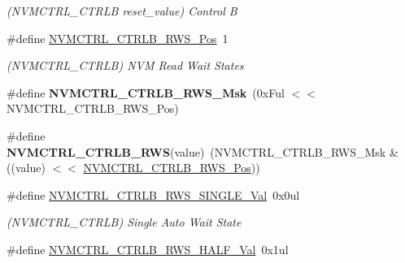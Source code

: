 \begin{DoxyCompactItemize}
\begin{DoxyCompactList}\small\item\em (N\+V\+M\+C\+T\+R\+L\+\_\+\+C\+T\+R\+L\+B reset\+\_\+value) Control B \end{DoxyCompactList}\item 
\hypertarget{group___s_a_m_l21___n_v_m_c_t_r_l_ga43e4b7eb29abd297bee59f003d715e26}{}\#define \hyperlink{group___s_a_m_l21___n_v_m_c_t_r_l_ga43e4b7eb29abd297bee59f003d715e26}{N\+V\+M\+C\+T\+R\+L\+\_\+\+C\+T\+R\+L\+B\+\_\+\+R\+W\+S\+\_\+\+Pos}~1\label{group___s_a_m_l21___n_v_m_c_t_r_l_ga43e4b7eb29abd297bee59f003d715e26}

\begin{DoxyCompactList}\small\item\em (N\+V\+M\+C\+T\+R\+L\+\_\+\+C\+T\+R\+L\+B) N\+V\+M Read Wait States \end{DoxyCompactList}\item 
\hypertarget{group___s_a_m_l21___n_v_m_c_t_r_l_gab5ad30e9547cbcc159748e0f014567f0}{}\#define {\bfseries N\+V\+M\+C\+T\+R\+L\+\_\+\+C\+T\+R\+L\+B\+\_\+\+R\+W\+S\+\_\+\+Msk}~(0x\+Ful $<$$<$ N\+V\+M\+C\+T\+R\+L\+\_\+\+C\+T\+R\+L\+B\+\_\+\+R\+W\+S\+\_\+\+Pos)\label{group___s_a_m_l21___n_v_m_c_t_r_l_gab5ad30e9547cbcc159748e0f014567f0}

\item 
\hypertarget{group___s_a_m_l21___n_v_m_c_t_r_l_ga5b3f59c294e4c40249e9b361cb580e6f}{}\#define {\bfseries N\+V\+M\+C\+T\+R\+L\+\_\+\+C\+T\+R\+L\+B\+\_\+\+R\+W\+S}(value)~(N\+V\+M\+C\+T\+R\+L\+\_\+\+C\+T\+R\+L\+B\+\_\+\+R\+W\+S\+\_\+\+Msk \& ((value) $<$$<$ \hyperlink{group___s_a_m_l21___n_v_m_c_t_r_l_ga43e4b7eb29abd297bee59f003d715e26}{N\+V\+M\+C\+T\+R\+L\+\_\+\+C\+T\+R\+L\+B\+\_\+\+R\+W\+S\+\_\+\+Pos}))\label{group___s_a_m_l21___n_v_m_c_t_r_l_ga5b3f59c294e4c40249e9b361cb580e6f}

\item 
\hypertarget{group___s_a_m_l21___n_v_m_c_t_r_l_ga38b52d3de7998f872c54a599e4e21f25}{}\#define \hyperlink{group___s_a_m_l21___n_v_m_c_t_r_l_ga38b52d3de7998f872c54a599e4e21f25}{N\+V\+M\+C\+T\+R\+L\+\_\+\+C\+T\+R\+L\+B\+\_\+\+R\+W\+S\+\_\+\+S\+I\+N\+G\+L\+E\+\_\+\+Val}~0x0ul\label{group___s_a_m_l21___n_v_m_c_t_r_l_ga38b52d3de7998f872c54a599e4e21f25}

\begin{DoxyCompactList}\small\item\em (N\+V\+M\+C\+T\+R\+L\+\_\+\+C\+T\+R\+L\+B) Single Auto Wait State \end{DoxyCompactList}\item 
\hypertarget{group___s_a_m_l21___n_v_m_c_t_r_l_gaaf0413ccbb9e3c4ebfe2c2f8f2a10da6}{}\#define \hyperlink{group___s_a_m_l21___n_v_m_c_t_r_l_gaaf0413ccbb9e3c4ebfe2c2f8f2a10da6}{N\+V\+M\+C\+T\+R\+L\+\_\+\+C\+T\+R\+L\+B\+\_\+\+R\+W\+S\+\_\+\+H\+A\+L\+F\+\_\+\+Val}~0x1ul\label{group___s_a_m_l21___n_v_m_c_t_r_l_gaaf0413ccbb9e3c4ebfe2c2f8f2a10da6}


\end{DoxyCompactItemize}
